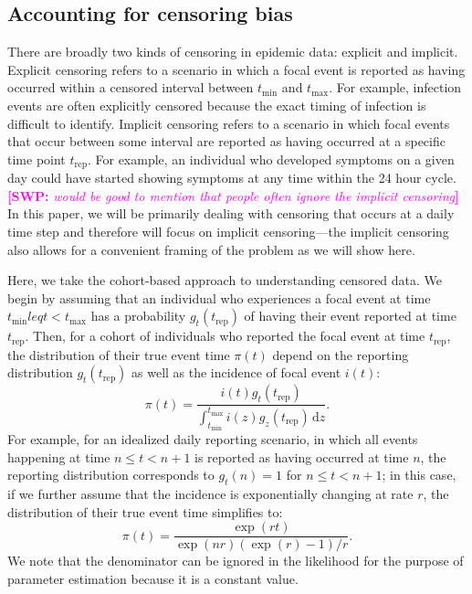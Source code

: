 \documentclass[12pt]{article}
\newcommand{\comment}{\showcomment}
\newcommand{\showcomment}[3]{\textcolor{#1}{\textbf{[#2: }\textsl{#3}\textbf{]}}}
\newcommand{\swp}[1]{\comment{magenta}{SWP}{#1}}
\newcommand{\dd}[1]{\ensuremath{\, \mathrm{d}#1}}
\newcommand{\tmin}{{t_{\mathrm{min}}}}
\newcommand{\tmax}{{t_{\mathrm{max}}}}
\newcommand{\trep}{{t_{\mathrm{rep}}}}
\begin{document}
\subsection{Accounting for censoring bias}

There are broadly two kinds of censoring in epidemic data: explicit and implicit.
Explicit censoring refers to a scenario in which a focal event is reported as having occurred within a censored interval between $\tmin$ and $\tmax$.
For example, infection events are often explicitly censored because the exact timing of infection is difficult to identify.
Implicit censoring refers to a scenario in which focal events that occur between some interval are reported as having occurred at a specific time point $\trep$.
For example, an individual who developed symptoms on a given day could have started showing symptoms at any time within the 24 hour cycle.
\swp{would be good to mention that people often ignore the implicit censoring}
In this paper, we will be primarily dealing with censoring that occurs at a daily time step and therefore will focus on implicit censoring---the implicit censoring also allows for a convenient framing of the problem as we will show here.

Here, we take the cohort-based approach to understanding censored data.
We begin by assuming that an individual who experiences a focal event at time $\tmin leq t < \tmax$ has a probability $g_t(\trep)$ of having their event reported at time $\trep$.
Then, for a cohort of individuals who reported the focal event at time $\trep$, the distribution of their true event time $\pi(t)$ depend on the reporting distribution $g_t(\trep)$ as well as the incidence of focal event $i(t)$:
\begin{equation}
\pi(t) = \frac{i(t) g_t(\trep)}{\int_{\tmin}^\tmax i(z) g_z(\trep) \dd z}.
\end{equation}
For example, for an idealized daily reporting scenario, in which all events happening at time $n \leq t < n+1$ is reported as having occurred at time $n$, the reporting distribution corresponds to $g_t(n) = 1$ for $n \leq t < n+1$;
in this case, if we further assume that the incidence is exponentially changing at rate $r$, the distribution of their true event time simplifies to:
\begin{equation}
\pi(t) = \frac{\exp(rt)}{\exp(nr) (\exp(r) - 1)/r}.
\end{equation}
We note that the denominator can be ignored in the likelihood for the purpose of parameter estimation because it is a constant value.
\end{document}
